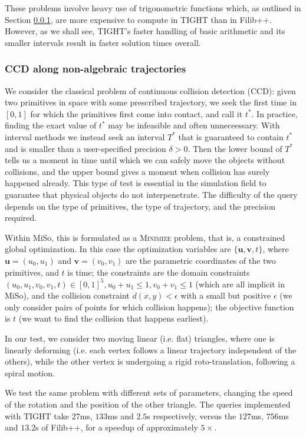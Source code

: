 These problems involve heavy use of trigonometric functions which, as outlined in Section \ref{}, are more expensive to compute in TIGHT than in Filib++.
However, as we shall see, TIGHT's faster handling of basic arithmetic and its smaller intervals result in faster solution times overall.

\subsubsection{CCD along non-algebraic trajectories}
We consider the classical problem of continuous collision detection (CCD): given two primitives in space with some prescribed trajectory, we seek the first time in $[0,1]$ for which the primitives first come into contact, and call it $t^*$.
In practice, finding the exact value of $t^*$ may be infeasible and often unneceessary. With interval methods we instead seek an interval $T^*$ that is guaranteed to contain $t^*$ and is smaller than a user-specified precision $\delta>0$.
Then the lower bound of $T^*$ tells us a moment in time until which we can safely move the objects without collisions, and the upper bound gives a moment when collision has surely happened already.
This type of test is essential in the simulation field to guarantee that physical objects do not interpenetrate.
The difficulty of the query depends on the type of primitives, the type of trajectory, and the precision required.

Within MiSo, this is formulated as a \textsc{Minimize} problem, that is, a constrained global optimization.
In this case the optimization variables are $\{\mathbf{u}, \mathbf{v}, t\}$, where $\mathbf{u}=(u_0, u_1)$ and $\mathbf{v}=(v_0, v_1)$ are the parametric coordinates of the two primitives, and $t$ is time;
the constraints are the domain constraints $(u_0,u_1,v_0,v_1,t)\in[0,1]^5, u_0+u_1\leq1, v_0+v_1\leq1$ (which are all implicit in MiSo), and the collision constraint $d(x,y)<\epsilon$ with a small but positive $\epsilon$ (we only consider pairs of points for which collision happens);
the objective function is $t$ (we want to find the collision that happens earliest).

In our test, we consider two moving linear (i.e. flat) triangles, where one is linearly deforming (i.e. each vertex follows a linear trajectory independent of the others), while the other vertex is undergoing a rigid roto-translation, following a spiral motion.

We test the same problem with different sets of parameters, changing the speed of the rotation and the position of the other triangle. The queries implemented with TIGHT take $27$ms, $133$ms and $2.5$s respectively, versus the $127$ms, $756$ms and $13.2$s of Filib++, for a speedup of approximately $5\times$.


